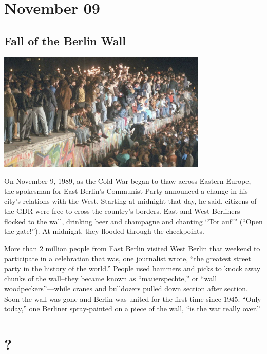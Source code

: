 \documentclass[11pt]{report}
\begin{document}
\section{November 09}
\subsection{Fall of the Berlin Wall}
\vspace{2mm}\begin{center}\includegraphics[width=10cm]{./img/fallBerlinWall.jpg}\end{center}
On November 9, 1989, as the Cold War began to thaw across Eastern Europe, the spokesman for East Berlin’s Communist Party announced a change in his city’s relations with the West. Starting at midnight that day, he said, citizens of the GDR were free to cross the country’s borders. East and West Berliners flocked to the wall, drinking beer and champagne and chanting “Tor auf!” (“Open the gate!”). At midnight, they flooded through the checkpoints.

More than 2 million people from East Berlin visited West Berlin that weekend to participate in a celebration that was, one journalist wrote, “the greatest street party in the history of the world.” People used hammers and picks to knock away chunks of the wall–they became known as “mauerspechte,” or “wall woodpeckers”—while cranes and bulldozers pulled down section after section. Soon the wall was gone and Berlin was united for the first time since 1945. “Only today,” one Berliner spray-painted on a piece of the wall, “is the war really over.”

\section{?}
\end{document}
